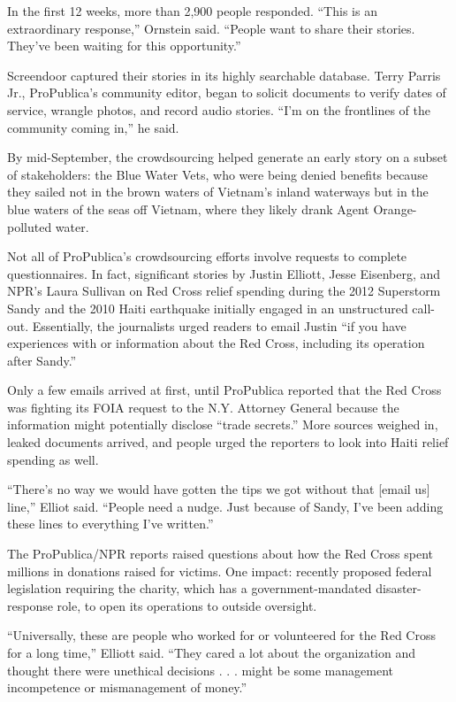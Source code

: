 \begin{itemize}
\begin{itemize}
\begin{enumerate}
{In the first 12 weeks, more than 2,900 people responded. “This is an extraordinary response,” Ornstein said. “People want to share their stories. They’ve been waiting for this opportunity.”

Screendoor captured their stories in its highly searchable database. Terry Parris Jr., ProPublica’s community editor, began to solicit documents to verify dates of service, wrangle photos, and record audio stories. “I’m on the frontlines of the community coming in,” he said.\autocite{Parris}

By mid-September, the crowdsourcing helped generate an early story on a subset of stakeholders: the Blue Water Vets, who were being denied benefits because they sailed not in the brown waters of Vietnam’s inland waterways but in the blue waters of the seas off Vietnam, where they likely drank Agent Orange-polluted water.

Not all of ProPublica’s crowdsourcing efforts involve requests to complete questionnaires. In fact, significant stories by Justin Elliott, Jesse Eisenberg, and NPR’s Laura Sullivan on Red Cross relief spending during the 2012 Superstorm Sandy and the 2010 Haiti earthquake initially engaged in an unstructured call-out. Essentially, the journalists urged readers to email Justin “if you have experiences with or information about the Red Cross, including its operation after Sandy.”

Only a few emails arrived at first, until ProPublica reported that the Red Cross was fighting its FOIA request to the N.Y. Attorney General because the information might potentially disclose “trade secrets.” More sources weighed in, leaked documents arrived, and people urged the reporters to look into Haiti relief spending as well.  

“There’s no way we would have gotten the tips we got without that [email us] line,” Elliot said. “People need a nudge. Just because of Sandy, I’ve been adding these lines to everything I’ve written.”

The ProPublica/NPR reports raised questions about how the Red Cross spent millions in donations raised for victims. One impact: recently proposed federal legislation requiring the charity, which has a government-mandated disaster-response role, to open its operations to outside oversight.

“Universally, these are people who worked for or volunteered for the Red Cross for a long time,” Elliott said. “They cared a lot about the organization and thought there were unethical decisions . . . might be some management incompetence or mismanagement of money.”  

}
\end{enumerate}
\end{itemize}
\end{itemize}
